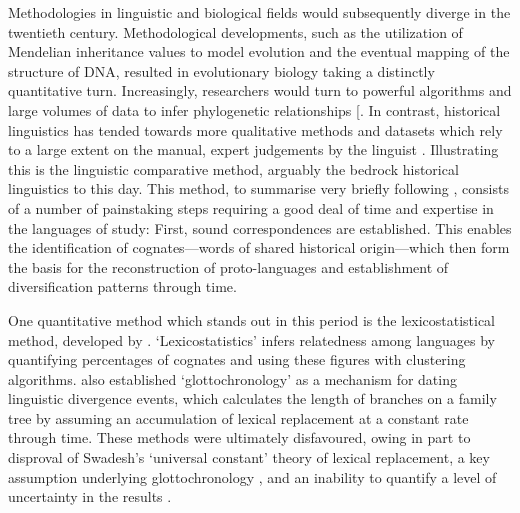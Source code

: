 Methodologies in linguistic and biological fields would subsequently diverge in the twentieth century. Methodological developments, such as the utilization of Mendelian inheritance values to model evolution and the eventual mapping of the structure of DNA, resulted in evolutionary biology taking a distinctly quantitative turn. Increasingly, researchers would turn to powerful algorithms and large volumes of data to infer phylogenetic relationships {[}\textcite{atkinson_curious_2005}. In contrast, historical linguistics has tended towards more qualitative methods and datasets which rely to a large extent on the manual, expert judgements by the linguist \autocite{nunn_comparative_2011}. Illustrating this is the linguistic comparative method, arguably the bedrock historical linguistics to this day. This method, to summarise very briefly following \textcite{thomason_language_1992}, consists of a number of painstaking steps requiring a good deal of time and expertise in the languages of study: First, sound correspondences are established. This enables the identification of cognates---words of shared historical origin---which then form the basis for the reconstruction of proto-languages and establishment of diversification patterns through time.

One quantitative method which stands out in this period is the lexicostatistical method, developed by \textcite{swadesh_lexico-statistic_1952}. `Lexicostatistics' infers relatedness among languages by quantifying percentages of cognates and using these figures with clustering algorithms. \textcite{swadesh_towards_1955} also established `glottochronology' as a mechanism for dating linguistic divergence events, which calculates the length of branches on a family tree by assuming an accumulation of lexical replacement at a constant rate through time. These methods were ultimately disfavoured, owing in part to disproval of Swadesh's `universal constant' theory of lexical replacement, a key assumption underlying glottochronology \autocite{blust_why_2000}, and an inability to quantify a level of uncertainty in the results \autocite{atkinson_curious_2005}.

